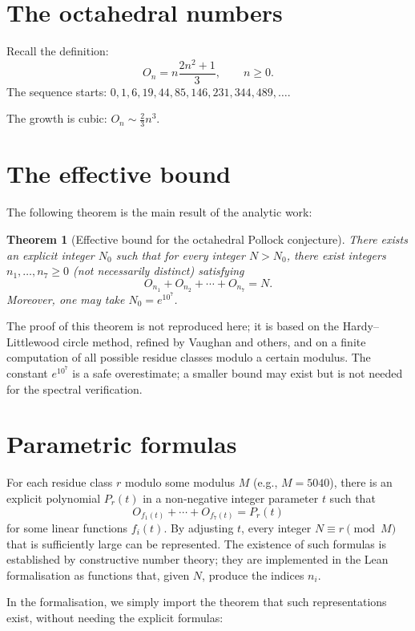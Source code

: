 \documentclass[11pt,a4paper]{article}
\newtheorem{theorem}{Theorem}[section]
\begin{document}
\section{The octahedral numbers}

Recall the definition:
\[
O_n = n\frac{2n^2+1}{3},\qquad n \ge 0.
\]
The sequence starts: \(0,1,6,19,44,85,146,231,344,489,\dots\).

The growth is cubic: \(O_n \sim \frac{2}{3}n^3\).

\section{The effective bound}

The following theorem is the main result of the analytic work:

\begin{theorem}[Effective bound for the octahedral Pollock conjecture]
There exists an explicit integer \(N_0\) such that for every integer \(N > N_0\), there exist integers \(n_1,\dots,n_7 \ge 0\) (not necessarily distinct) satisfying
\[
O_{n_1} + O_{n_2} + \cdots + O_{n_7} = N.
\]
Moreover, one may take \(N_0 = e^{10^7}\).
\end{theorem}
The proof of this theorem is not reproduced here; it is based on the Hardy–Littlewood circle method, refined by Vaughan and others, and on a finite computation of all possible residue classes modulo a certain modulus. The constant \(e^{10^7}\) is a safe overestimate; a smaller bound may exist but is not needed for the spectral verification.

\section{Parametric formulas}

For each residue class \(r\) modulo some modulus \(M\) (e.g., \(M = 5040\)), there is an explicit polynomial \(P_r(t)\) in a non‑negative integer parameter \(t\) such that
\[
O_{f_1(t)} + \cdots + O_{f_7(t)} = P_r(t)
\]
for some linear functions \(f_i(t)\). By adjusting \(t\), every integer \(N \equiv r \pmod{M}\) that is sufficiently large can be represented. The existence of such formulas is established by constructive number theory; they are implemented in the Lean formalisation as functions that, given \(N\), produce the indices \(n_i\).

In the formalisation, we simply import the theorem that such representations exist, without needing the explicit formulas:
\end{document}
